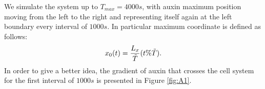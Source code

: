 We simulate the system up to $T_{max} = 4000s$, with auxin maximum position moving from the left to the right and representing itself again at the left boundary every interval of $1000s$. In particular maximum coordinate is defined as follows:
\begin{equation*}
  x_0(t) = \frac{L_x}{\Tilde{T}} (t\% \Tilde{T}).
\end{equation*}
In order to give a better idea, the gradient of auxin that crosses the cell system for the first interval of $1000s$ is presented in Figure \ref{fig:A1}.

